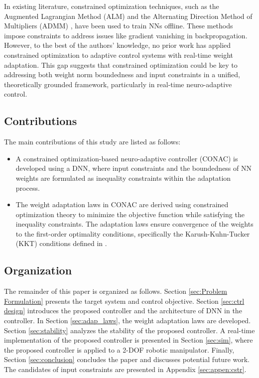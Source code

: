 \documentclass[lettersize,journal]{IEEEtran}
\begin{document}
In existing literature, constrained optimization techniques, such as the Augmented Lagrangian Method (ALM) \cite{Evens:2021aa} and the Alternating Direction Method of Multipliers (ADMM) \cite{Wang:2019aa,Taylor:2016aa}, have been used to train NNs offline. 
These methods impose constraints to address issues like gradient vanishing in backpropagation. 
However, to the best of the authors' knowledge, no prior work has applied constrained optimization to adaptive control systems with real-time weight adaptation. 
This gap suggests that constrained optimization could be key to addressing both weight norm boundedness and input constraints in a unified, theoretically grounded framework, particularly in real-time neuro-adaptive control.

\subsection{Contributions}

The main contributions of this study are listed as follows:
\begin{itemize}
    \item A constrained optimization-based neuro-adaptive controller (CONAC) is developed using a DNN, where input constraints and the boundedness of NN weights are formulated as inequality constraints within the adaptation process.
    \item The weight adaptation laws in CONAC are derived using constrained optimization theory to minimize the objective function while satisfying the inequality constraints. The adaptation laws ensure convergence of the weights to the first-order optimality conditions, specifically the Karush-Kuhn-Tucker (KKT) conditions defined in \cite[Chap. 12 Thm. 12.1]{Nocedal:2006aa}. 
\end{itemize}

\subsection{Organization}

The remainder of this paper is organized as follows. 
Section \ref{sec:Problem Formulation} presents the target system and control objective.
Section \ref{sec:ctrl design} introduces the proposed controller and the architecture of DNN in the controller. 
In Section \ref{sec:adap_laws}, the weight adaptation laws are developed.
Section \ref{sec:stability} analyzes the stability of the proposed controller.
A real-time implementation of the proposed controller is presented in Section \ref{sec:sim}, where the proposed controller is applied to a 2-DOF robotic manipulator.
Finally, Section \ref{sec:conclusion} concludes the paper and discusses potential future work.
The candidates of input constraints are presented in Appendix \ref{sec:appen:cstr}.
\end{document}
